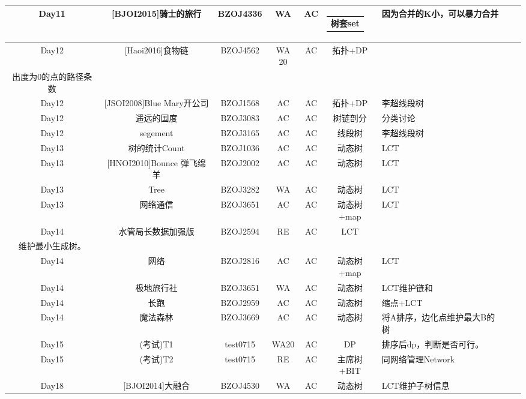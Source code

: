 \documentclass[landscape]{article}
\makeatletter
\newcommand{\tabincell}[2]{\begin{tabular}{@{}#1@{}}#2\end{tabular}}
\makeatother
\begin{document}
\begin{longtable}{cccccclll}
  \hline
  Day11 & [BJOI2015]骑士的旅行 & BZOJ4336 & \color{red} WA  & \color{green} AC & \tabincell{l}{树套set} & 因为合并的K小，可以暴力合并\\
  \hline
  Day12 & [Haoi2016]食物链 & BZOJ4562 & \color{red} WA 20  & \color{green} AC & 拓扑+DP & \tabincell{l}{即求所有入度为0的点到\\出度为0的点的路径条数}\\
  \hline
  Day12 & [JSOI2008]Blue Mary开公司 & BZOJ1568 & \color{green} AC  & \color{green} AC & 拓扑+DP & 李超线段树\\
  \hline
  Day12 & 遥远的国度 & BZOJ3083 & \color{green} AC  & \color{green} AC & 树链剖分 & 分类讨论 \\
  \hline
  Day12 & segement & BZOJ3165 & \color{green} AC  & \color{green} AC & 线段树 & 李超线段树\\
  \hline
  Day13 & 树的统计Count & BZOJ1036 & \color{green} AC  & \color{green} AC & 动态树 & LCT\\
  \hline
  Day13 & [HNOI2010]Bounce 弹飞绵羊  & BZOJ2002 & \color{green} AC  & \color{green} AC & 动态树 & LCT\\
  \hline
  Day13 &  Tree  & BZOJ3282 & \color{red} WA  & \color{green} AC & 动态树 & LCT\\
  \hline
  Day13 &  网络通信  & BZOJ3651 & \color{green} AC  & \color{green} AC & 动态树+map & LCT\\
  \hline
  Day14 &  水管局长数据加强版  & BZOJ2594 & \color{purple} RE  & \color{green} AC & LCT & \tabincell{l}{边转换成一个点，倒序加边，\\维护最小生成树。}\\
  \hline
  Day14 &  网络  & BZOJ2816 & \color{green} AC  & \color{green} AC & 动态树+map & LCT\\
  \hline
  Day14 &  极地旅行社  & BZOJ3651 & \color{red} WA  & \color{green} AC & 动态树 & LCT维护链和\\
  \hline
  Day14 &  长跑  & BZOJ2959 & \color{green} AC  & \color{green} AC & 动态树 & 缩点+LCT\\
  \hline
  Day14 &  魔法森林  & BZOJ3669 & \color{green} AC  & \color{green} AC & 动态树 & 将A排序，边化点维护最大B的树\\
  \hline
  Day15 &  (考试)T1  & test0715 & \color{red} WA20  & \color{green} AC & DP & 排序后dp，判断是否可行。\\
  \hline
  Day15 &  (考试)T2  & test0715 & \color{purple} RE  & \color{green} AC & 主席树+BIT & 同网络管理Network\\
  \hline
  Day18 &  [BJOI2014]大融合  & BZOJ4530 & \color{red} WA  & \color{green} AC & 动态树 & LCT维护子树信息\\

\end{longtable}
\end{document}

